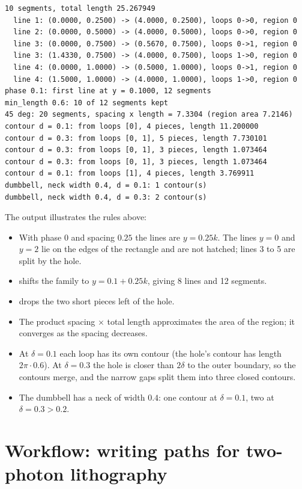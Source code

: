
\begin{lstlisting}[style=text]
10 segments, total length 25.267949
  line 1: (0.0000, 0.2500) -> (4.0000, 0.2500), loops 0->0, region 0
  line 2: (0.0000, 0.5000) -> (4.0000, 0.5000), loops 0->0, region 0
  line 3: (0.0000, 0.7500) -> (0.5670, 0.7500), loops 0->1, region 0
  line 3: (1.4330, 0.7500) -> (4.0000, 0.7500), loops 1->0, region 0
  line 4: (0.0000, 1.0000) -> (0.5000, 1.0000), loops 0->1, region 0
  line 4: (1.5000, 1.0000) -> (4.0000, 1.0000), loops 1->0, region 0
phase 0.1: first line at y = 0.1000, 12 segments
min_length 0.6: 10 of 12 segments kept
45 deg: 20 segments, spacing x length = 7.3304 (region area 7.2146)
contour d = 0.1: from loops [0], 4 pieces, length 11.200000
contour d = 0.3: from loops [0, 1], 5 pieces, length 7.730101
contour d = 0.3: from loops [0, 1], 3 pieces, length 1.073464
contour d = 0.3: from loops [0, 1], 3 pieces, length 1.073464
contour d = 0.1: from loops [1], 4 pieces, length 3.769911
dumbbell, neck width 0.4, d = 0.1: 1 contour(s)
dumbbell, neck width 0.4, d = 0.3: 2 contour(s)
\end{lstlisting}

The output illustrates the rules above:

\begin{itemize}
\item With phase 0 and spacing $0.25$ the lines are $y = 0.25k$. The lines $y=0$ and $y=2$
lie on the edges of the rectangle and are not hatched; lines 3 to 5 are split by the hole.
\item {} shifts the family to $y = 0.1 + 0.25k$, giving 8 lines and 12 segments.
\item {} drops the two short pieces left of the hole.
\item The product spacing $\times$ total length approximates the area of the region; it
converges as the spacing decreases.
\item At $\delta=0.1$ each loop has its own contour (the hole's contour has length
$2\pi\cdot0.6$). At $\delta=0.3$ the hole is closer than $2\delta$ to the outer boundary, so
the contours merge, and the narrow gaps split them into three closed contours.
\item The dumbbell has a neck of width $0.4$: one contour at $\delta = 0.1$, two at
$\delta = 0.3 > 0.2$.
\end{itemize}

\section{Workflow: writing paths for two-photon lithography}\label{sec:2pp}

